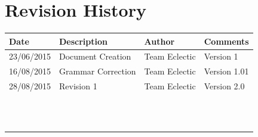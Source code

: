 \documentclass[11pt]{article}
\begin{document}


\setcounter{tocdepth}{3}
\setcounter{secnumdepth}{5}
\tableofcontents
\newpage
\section{Revision History}
\begin{table}[h]
\begin{tabular}{llll}
\textbf{Date}          & \textbf{Description}  & \textbf{Author}       & \textbf{Comments}   \\ \hline
\multicolumn{1}{|R{2cm}|}{23/06/2015} & \multicolumn{1}{L{4.5cm}|}{Document Creation} & \multicolumn{1}{l|}{Team Eclectic} & \multicolumn{1}{L{4cm}|}{Version 1} \\ \hline
\multicolumn{1}{|R{2cm}|}{16/08/2015} & \multicolumn{1}{L{4.5cm}|}{Grammar Correction} & \multicolumn{1}{l|}{Team Eclectic} & \multicolumn{1}{L{4cm}|}{Version 1.01} \\ \hline
\multicolumn{1}{|R{2cm}|}{28/08/2015} & \multicolumn{1}{L{4.5cm}|}{Revision 1} & \multicolumn{1}{l|}{Team Eclectic} & \multicolumn{1}{L{4cm}|}{Version 2.0} \\ \hline
\multicolumn{1}{|l|}{} & \multicolumn{1}{l|}{} & \multicolumn{1}{l|}{} & \multicolumn{1}{l|}{} \\ \hline
\multicolumn{1}{|l|}{} & \multicolumn{1}{l|}{} & \multicolumn{1}{l|}{} & \multicolumn{1}{l|}{} \\ \hline
\multicolumn{1}{|l|}{} & \multicolumn{1}{l|}{} & \multicolumn{1}{l|}{} & \multicolumn{1}{l|}{} \\ \hline
\multicolumn{1}{|l|}{} & \multicolumn{1}{l|}{} & \multicolumn{1}{l|}{} & \multicolumn{1}{l|}{} \\ \hline
\multicolumn{1}{|l|}{} & \multicolumn{1}{l|}{} & \multicolumn{1}{l|}{} & \multicolumn{1}{l|}{} \\ \hline
\multicolumn{1}{|l|}{} & \multicolumn{1}{l|}{} & \multicolumn{1}{l|}{} & \multicolumn{1}{l|}{} \\ \hline
\multicolumn{1}{|l|}{} & \multicolumn{1}{l|}{} & \multicolumn{1}{l|}{} & \multicolumn{1}{l|}{} \\ \hline
\multicolumn{1}{|l|}{} & \multicolumn{1}{l|}{} & \multicolumn{1}{l|}{} & \multicolumn{1}{l|}{} \\ \hline
\multicolumn{1}{|l|}{} & \multicolumn{1}{l|}{} & \multicolumn{1}{l|}{} & \multicolumn{1}{l|}{} \\ \hline
\multicolumn{1}{|l|}{} & \multicolumn{1}{l|}{} & \multicolumn{1}{l|}{} & \multicolumn{1}{l|}{} \\ \hline
\multicolumn{1}{|l|}{} & \multicolumn{1}{l|}{} & \multicolumn{1}{l|}{} & \multicolumn{1}{l|}{} \\ \hline
\multicolumn{1}{|l|}{} & \multicolumn{1}{l|}{} & \multicolumn{1}{l|}{} & \multicolumn{1}{l|}{} \\ \hline
\end{tabular}
\end{table}
\end{document}

